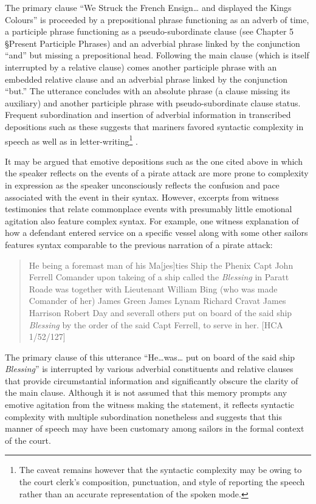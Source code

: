 The primary clause “We Struck the French Ensign… and displayed the Kings Colours” is proceeded by a prepositional phrase functioning as an adverb of time, a participle phrase functioning as a pseudo-subordinate clause (see Chapter 5 §Present Participle Phrases) and an adverbial phrase linked by the conjunction “and” but missing a prepositional head. Following the main clause (which is itself interrupted by a relative clause) comes another participle phrase with an embedded relative clause and an adverbial phrase linked by the conjunction “but.” The utterance concludes with an absolute phrase (a clause missing its auxiliary) and another participle phrase with pseudo-subordinate clause status. Frequent subordination and insertion of adverbial information in transcribed depositions such as these suggests that mariners favored syntactic complexity in speech as well as in letter-writing\footnote{The caveat remains however that the syntactic complexity may be owing to the court clerk’s composition, punctuation, and style of reporting the speech rather than an accurate representation of the spoken mode.} . 

  It may be argued that emotive depositions such as the one cited above in which the speaker reflects on the events of a pirate attack are more prone to complexity in expression as the speaker unconsciously reflects the confusion and pace associated with the event in their syntax. However, excerpts from witness testimonies that relate commonplace events with presumably little emotional agitation also feature complex syntax. For example, one witness explanation of how a defendant entered service on a specific vessel along with some other sailors features syntax comparable to the previous narration of a pirate attack:

\begin{quotation}
He being a foremast man of his Ma[jes]ties Ship the Phenix Capt John Ferrell Comander upon takeing of a ship called the \textit{Blessing} in Paratt Roade was together with Lieutenant William Bing (who was made Comander of her) James Green James Lynam Richard Cravat James Harrison Robert Day and severall others put on board of the said ship \textit{Blessing} by the order of the said Capt Ferrell, to serve in her. [HCA 1/52/127]\end{quotation}

The primary clause of this utterance “He…was… put on board of the said ship \textit{Blessing}” is interrupted by various adverbial constituents and relative clauses that provide circumstantial information and significantly obscure the clarity of the main clause. Although it is not assumed that this memory prompts any emotive agitation from the witness making the statement, it reflects syntactic complexity with multiple subordination nonetheless and suggests that this manner of speech may have been customary among sailors in the formal context of the court. 

